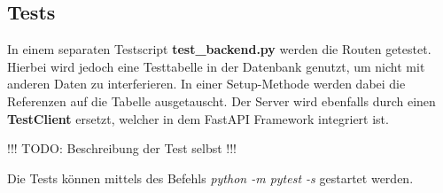 \subsection{Tests}
In einem separaten Testscript \textbf{test\_backend.py} werden die Routen getestet. 
Hierbei wird jedoch eine Testtabelle in der Datenbank genutzt, um nicht mit anderen Daten zu interferieren. 
In einer Setup-Methode werden dabei die Referenzen auf die Tabelle ausgetauscht. 
Der Server wird ebenfalls durch einen \textbf{TestClient} ersetzt, welcher in dem FastAPI Framework integriert ist.

!!! TODO: Beschreibung der Test selbst !!!

Die Tests können mittels des Befehls \textit{python -m pytest -s} gestartet werden.
